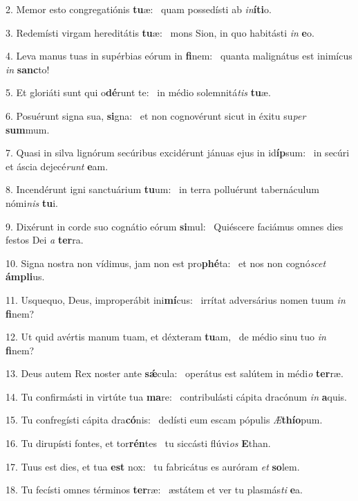 2. Memor esto congregatiónis \textbf{tu}æ: \ast\  quam possedísti ab \textit{in}\textbf{í}\textbf{ti}o.\

3. Redemísti virgam hereditátis \textbf{tu}æ: \ast\  mons Sion, in quo habitásti \textit{in} \textbf{e}o.\

4. Leva manus tuas in supérbias eórum in \textbf{fi}nem: \ast\  quanta malignátus est inimícus \textit{in} \textbf{sanc}to!\

5. Et gloriáti sunt qui o\textbf{dé}runt te: \ast\  in médio solemnitá\textit{tis} \textbf{tu}æ.\

6. Posuérunt signa sua, \textbf{si}gna: \ast\  et non cognovérunt sicut in éxitu su\textit{per} \textbf{sum}mum.\

7. Quasi in silva lignórum secúribus excidérunt jánuas ejus in id\textbf{íp}sum: \ast\  in secúri et áscia dejecé\textit{runt} \textbf{e}am.\

8. Incendérunt igni sanctuárium \textbf{tu}um: \ast\  in terra polluérunt tabernáculum nómi\textit{nis} \textbf{tu}i.\

9. Dixérunt in corde suo cognátio eórum \textbf{si}mul: \ast\  Quiéscere faciámus omnes dies festos Dei \textit{a} \textbf{ter}ra.\

10. Signa nostra non vídimus, jam non est pro\textbf{phé}ta: \ast\  et nos non cognó\textit{scet} \textbf{ám}\textbf{pli}us.\

11. Usquequo, Deus, improperábit ini\textbf{mí}cus: \ast\  irrítat adversárius nomen tuum \textit{in} \textbf{fi}nem?\

12. Ut quid avértis manum tuam, et déxteram \textbf{tu}am, \ast\  de médio sinu tuo \textit{in} \textbf{fi}nem?\

13. Deus autem Rex noster ante \textbf{sǽ}cula: \ast\  operátus est salútem in médi\textit{o} \textbf{ter}ræ.\

14. Tu confirmásti in virtúte tua \textbf{ma}re: \ast\  contribulásti cápita dracónum \textit{in} \textbf{a}quis.\

15. Tu confregísti cápita dra\textbf{có}nis: \ast\  dedísti eum escam pópulis \textit{Æ}\textbf{thí}\textbf{o}pum.\

16. Tu dirupísti fontes, et tor\textbf{rén}tes \ast\  tu siccásti flúvi\textit{os} \textbf{E}than.\

17. Tuus est dies, et tua \textbf{est} nox: \ast\  tu fabricátus es auróram \textit{et} \textbf{so}lem.\

18. Tu fecísti omnes términos \textbf{ter}ræ: \ast\  æstátem et ver tu plasmás\textit{ti} \textbf{e}a.\

